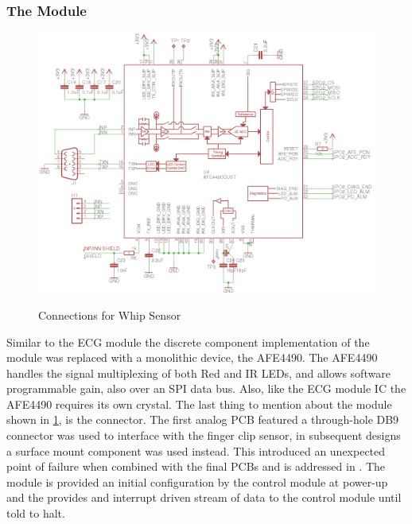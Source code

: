 \subsubsection{The  Module}

\begin{figure}
	\begin{center}
		\label{fig:Rev5_SPO2}
		\includegraphics[scale=1,width=\textwidth]{Images/Rev5_SPO2.png} 
		\caption{ Connections for Whip Sensor}
	\end{center}
\end{figure}
Similar to the ECG module the discrete component implementation of the  module was replaced with a monolithic device, the AFE4490.\cite{AFE4490} The AFE4490 handles the signal multiplexing of both Red and IR LEDs, and allows software programmable gain, also over an SPI data bus. Also, like the ECG module IC the AFE4490 requires its own crystal. The last thing to mention about the  module shown in \cref{fig:Rev5_SPO2}, is the connector. The first analog PCB featured a through-hole DB9 connector was used to interface with the finger clip sensor, in subsequent designs a surface mount component was used instead. This introduced an unexpected point of failure when combined with the final PCBs and is addressed in . The  module is provided an initial configuration by the control module at power-up and the provides and interrupt driven stream of data to the control module until told to halt.

